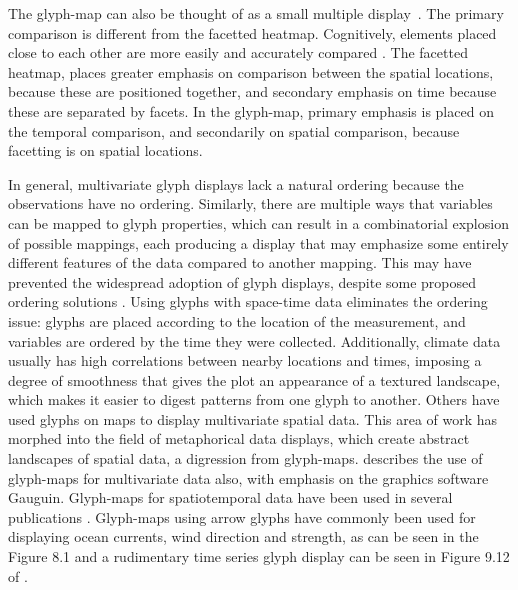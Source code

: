 \documentclass[oneside]{article}
\begin{document}
The glyph-map can also be thought of as a small multiple display~\citep{tufte:2001}. The primary comparison is different from the facetted heatmap. Cognitively, elements placed close to each other are more easily and accurately compared \citep{cleveland:1984}. The facetted heatmap, places greater emphasis on comparison between the spatial locations, because these are positioned together, and secondary emphasis on time because these are separated by facets. In the glyph-map, primary emphasis is placed on the temporal comparison, and secondarily on spatial comparison, because facetting is on spatial locations.  


In general, multivariate glyph displays lack a natural ordering because the observations have no ordering. Similarly, there are multiple ways that variables can be mapped to glyph properties, which can result in a combinatorial explosion of possible mappings, each producing a display that may emphasize some entirely different features of the data compared to another mapping. This may have prevented the widespread adoption of glyph displays, despite some proposed ordering solutions \citep{kleiner:1981,hurley:2010}. Using glyphs with space-time data eliminates the ordering issue: glyphs are placed according to the location of the measurement, and variables are ordered by the time they were collected. Additionally, climate data usually has high correlations between nearby locations and times, imposing a degree of smoothness that gives the plot an appearance of a textured  landscape, which makes it easier to digest patterns from one glyph to another. Others \citep{pickett:1988} have used glyphs on maps to display multivariate spatial data. This area of work has morphed into the field of metaphorical data displays, which create abstract landscapes of spatial data, a digression from glyph-maps. \citet{gribov:2006} describes the use of glyph-maps for multivariate data also, with emphasis on the graphics software Gauguin. Glyph-maps for spatiotemporal data have been used in several publications \citep{carr:1992,eden:2010,hobbs:2010}. Glyph-maps using arrow glyphs have commonly been used for displaying ocean currents, wind direction and strength, as can be seen in the Figure 8.1  and a rudimentary time series glyph display can be seen in Figure 9.12 of \citet{IPCC}. 
\end{document}
